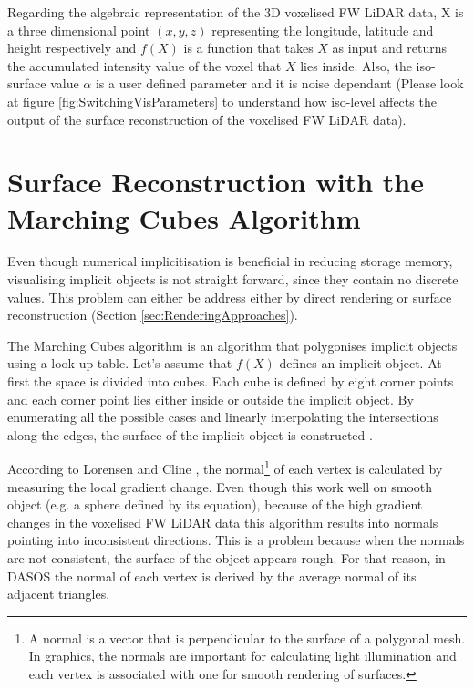 \documentclass{subfiles}
\begin{document}
\par Regarding the algebraic representation of the 3D voxelised FW LiDAR data, X is a three dimensional point $\mathit{(x, y, z) }$ representing the longitude, latitude and height respectively and ${f(X)}$ is a function that takes  $\mathit{X}$ as input and returns the accumulated intensity value of the voxel that  $\mathit{X}$ lies inside. Also, the iso-surface value $\mathit{\alpha }$ is a user defined parameter and it is noise dependant (Please look at figure \ref{fig:SwitchingVisParameters} to understand how iso-level  affects the output of the surface reconstruction of the voxelised FW LiDAR data). 




\section {Surface Reconstruction with the Marching Cubes Algorithm}\label{sec:SurfaceReconstruction}

\par Even though numerical implicitisation is beneficial in reducing storage memory, visualising implicit objects is not straight forward, since they contain no discrete values. This problem can either be address either by direct rendering or surface reconstruction (Section \ref{sec:RenderingApproaches}). 

\par The Marching Cubes algorithm is an algorithm that polygonises implicit objects using a look up table. Let’s assume that $f(X)$ defines an implicit object. At first the space is divided into cubes. Each cube is defined by eight corner points and each corner point lies either inside or outside the implicit object. By enumerating all the possible cases and linearly interpolating the intersections along the edges, the surface of the implicit object is constructed \cite{Lorensen1987}. 

\par According to Lorensen and Cline \cite{Lorensen1987}, the normal\footnote{
A normal is a vector that is perpendicular to the surface of a polygonal mesh. In graphics, the normals are important for calculating light illumination and each vertex is associated with one for smooth rendering of surfaces.} of each vertex is calculated by measuring the local gradient change. Even though this work well on smooth object (e.g. a sphere defined by its equation), because of the high gradient changes in the voxelised FW LiDAR data this algorithm results into normals pointing into inconsistent directions. This is a problem because when the normals are not consistent, the surface of the object appears rough. For that reason, in DASOS the normal of each vertex is derived by the average normal of its adjacent triangles. 
\end{document}
